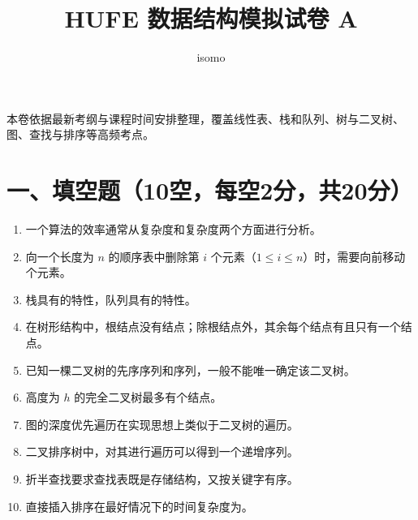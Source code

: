 \documentclass{../../note}
\title{HUFE 数据结构模拟试卷 A}
\author{isomo}
\begin{document}
\fontsize{12pt}{14.4pt}\selectfont
\maketitle

本卷依据最新考纲与课程时间安排整理，覆盖线性表、栈和队列、树与二叉树、图、查找与排序等高频考点。

\section*{一、填空题（10空，每空2分，共20分）}

\begin{enumerate}[itemsep=0.8em]
\item 一个算法的效率通常从\underline{\hspace{2cm}}复杂度和\underline{\hspace{2cm}}复杂度两个方面进行分析。
\item 向一个长度为 $n$ 的顺序表中删除第 $i$ 个元素（$1 \le i \le n$）时，需要向前移动\underline{\hspace{2cm}}个元素。
\item 栈具有\underline{\hspace{2cm}}的特性，队列具有\underline{\hspace{2cm}}的特性。
\item 在树形结构中，根结点没有\underline{\hspace{2cm}}结点；除根结点外，其余每个结点有且只有一个\underline{\hspace{2cm}}结点。
\item 已知一棵二叉树的先序序列和\underline{\hspace{2cm}}序列，一般不能唯一确定该二叉树。
\item 高度为 $h$ 的完全二叉树最多有\underline{\hspace{2cm}}个结点。
\item 图的深度优先遍历在实现思想上类似于二叉树的\underline{\hspace{2cm}}遍历。
\item 二叉排序树中，对其进行\underline{\hspace{2cm}}遍历可以得到一个递增序列。
\item 折半查找要求查找表既是\underline{\hspace{2cm}}存储结构，又按关键字有序。
\item 直接插入排序在最好情况下的时间复杂度为\underline{\hspace{2cm}}。
\end{enumerate}
\end{document}
